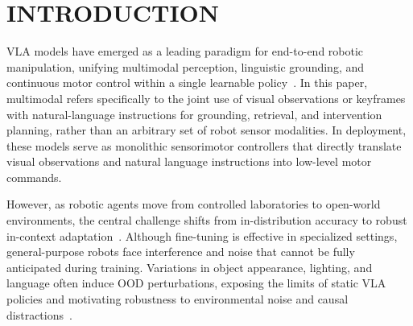 
\section{INTRODUCTION}
\renewcommand{\thefootnote}{\fnsymbol{footnote}}

\renewcommand{\thefootnote}{\arabic{footnote}}

VLA models have emerged as a leading paradigm for end-to-end robotic manipulation, unifying multimodal perception, linguistic grounding, and continuous motor control within a single learnable policy~\cite{VLA_review1, VLA_review2}.
{\color{black}In this paper, multimodal refers specifically to the joint use of visual observations or keyframes with natural-language instructions for grounding, retrieval, and intervention planning, rather than an arbitrary set of robot sensor modalities.}
In deployment, these models serve as monolithic sensorimotor controllers that directly translate visual observations and natural language instructions into low-level motor commands.

However, as robotic agents move from controlled laboratories to open-world environments, the central challenge shifts from in-distribution accuracy to robust in-context adaptation~\cite{Yuan2025FromST}.
Although fine-tuning is effective in specialized settings, general-purpose robots face interference and noise that cannot be fully anticipated during training.
Variations in object appearance, lighting, and language often induce OOD perturbations, exposing the limits of static VLA policies and motivating robustness to environmental noise and causal distractions~\cite{RT-2, hill2020humaninstructionfollowingdeepreinforcement, pmlr-v205-shah23b, liberopro,LIBERO-Plus}.


